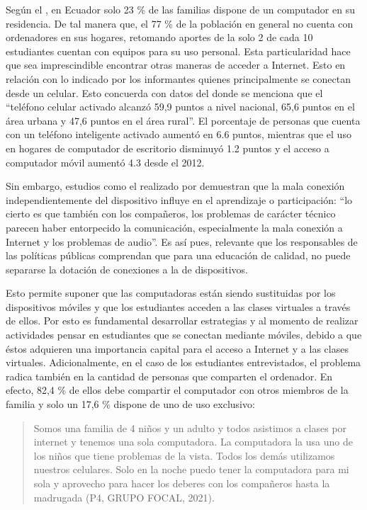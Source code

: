 \documentclass[spanish]{textolivre}
\begin{document}
Según el \textcite{instituto_nacional_de_estadisticas_y_censos_de_ecuador_[inec]_encuesta_2020}, en Ecuador solo 23 \% de las familias dispone de un computador en su residencia. De tal manera que, el 77 \% de la población en general no cuenta con ordenadores en sus hogares, retomando aportes de la \textcite{organizacion_de_las_naciones_unidas_[onu]_priorizar_2021} solo 2 de cada 10 estudiantes cuentan con equipos para su uso personal. Esta particularidad hace que sea imprescindible encontrar otras maneras de acceder a Internet. 
Esto en relación con lo indicado por los informantes quienes principalmente se conectan desde un celular. Esto concuerda con datos del \textcite[p. 19]{instituto_nacional_de_estadisticas_y_censos_de_ecuador_[inec]_tecnologias_2019} donde se menciona que el “teléfono celular activado alcanzó 59,9 puntos a nivel nacional, 65,6 puntos en el área urbana y 47,6 puntos en el área rural”. El porcentaje de personas que cuenta con un teléfono inteligente activado aumentó en 6.6 puntos, mientras que el uso en hogares de computador de escritorio disminuyó 1.2 puntos y el acceso a computador móvil aumentó 4.3 desde el 2012. 

Sin embargo, estudios como el realizado por \textcite[p. 213]{roig-vila_comunicacion_2021} demuestran que la mala conexión independientemente del dispositivo influye en el aprendizaje o participación: “lo cierto es que también con los compañeros, los problemas de carácter técnico parecen haber entorpecido la comunicación, especialmente la mala conexión a Internet y los problemas de audio”. Es así pues, relevante que los responsables de las políticas públicas comprendan que para una educación de calidad, no puede separarse la dotación de conexiones a la de dispositivos. 

Esto permite suponer que las computadoras están siendo sustituidas por los dispositivos móviles y que los estudiantes acceden a las clases virtuales a través de ellos.  Por esto es fundamental desarrollar estrategias y al momento de realizar actividades pensar en estudiantes que se conectan mediante móviles, debido a que éstos adquieren una importancia capital para el acceso a Internet y a las clases virtuales. Adicionalmente, en el caso de los estudiantes entrevistados, el problema radica también en la cantidad de personas que comparten el ordenador. En efecto, 82,4 \% de ellos debe compartir el computador con otros miembros de la familia y solo un 17,6 \% dispone de uno de uso exclusivo:

\begin{quote}
    Somos una familia de 4 niños y un adulto y todos asistimos a clases por internet y tenemos una sola computadora. La computadora la usa uno de los niños que tiene problemas de la vista. Todos los demás utilizamos nuestros celulares. Solo en la noche puedo tener la computadora para mi sola y aprovecho para hacer los deberes con los compañeros hasta la madrugada (P4, GRUPO FOCAL, 2021).
\end{quote}
\end{document}
